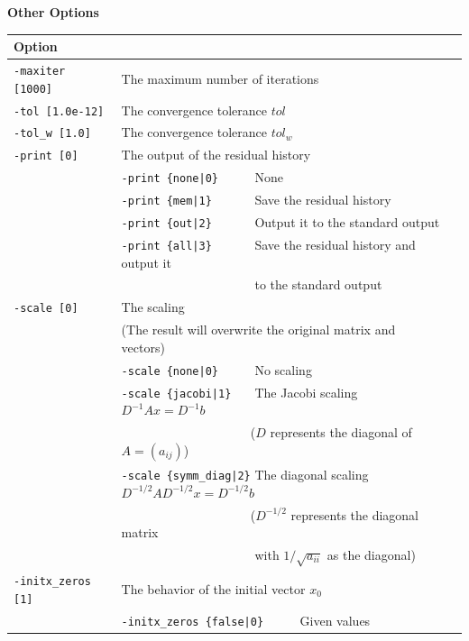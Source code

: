 \documentclass[a4paper]{article}
\begin{document}
\begin{minipage}[t]{\textwidth}
\begin{center}
{\bf Other Options}\\
\begin{tabular}{l|ll}\hline\hline
Option &                          \\ \hline
\verb=-maxiter [1000]= & The maximum number of iterations         \\ 
\verb=-tol [1.0e-12]=  & The convergence tolerance $tol$             \\
\verb=-tol_w [1.0]=    & The convergence tolerance $tol_w$  \\
\verb=-print [0]=      & The output of the residual history                \\
                       & \verb=-print {none|0}     =  None \\
                       & \verb=-print {mem|1}      =  Save the residual history\\
                       & \verb=-print {out|2}      =  Output it to the standard output\\
                       & \verb=-print {all|3}      =  Save the residual history and output it \\
                       & \verb=                    =  to the standard output\\
\verb=-scale [0]=      & The scaling \\
                       & (The result will overwrite the original matrix and vectors) \\
                       & \verb=-scale {none|0}     =  No scaling \\ 
                       & \verb=-scale {jacobi|1}   =  The Jacobi scaling $D^{-1}Ax=D^{-1}b$ \\
                       & \verb=                    =  ($D$ represents the diagonal of $A=(a_{ij})$)\\
                       & \verb=-scale {symm_diag|2}=  The diagonal scaling $D^{-1/2}AD^{-1/2}x=D^{-1/2}b$ \\
                       & \verb=                    =  ($D^{-1/2}$ represents the diagonal matrix \\
                       & \verb=                    =  with $1/\sqrt{a_{ii}}$ as the diagonal) \\ 
\verb=-initx_zeros [1]= & The behavior of the initial vector $x_{0}$  \\
                       & \verb=-initx_zeros {false|0}     =  Given values \\

\end{tabular}
\end{center}
\end{minipage}
\end{document}
